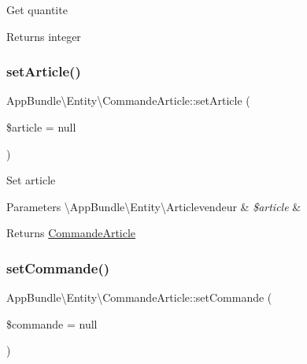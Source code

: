 Get quantite

\begin{DoxyReturn}{Returns}
integer 
\end{DoxyReturn}
\mbox{\label{class_app_bundle_1_1_entity_1_1_commande_article_a44944f056867cda01cbcfb7ca5b99f2a}} 
\subsubsection{\texorpdfstring{set\+Article()}{setArticle()}}
{\footnotesize\ttfamily App\+Bundle\textbackslash{}\+Entity\textbackslash{}\+Commande\+Article\+::set\+Article (\begin{DoxyParamCaption}\item[{\textbackslash{}\hyperlink{class_app_bundle_1_1_entity_1_1_articlevendeur}{App\+Bundle\textbackslash{}\+Entity\textbackslash{}\+Articlevendeur}}]{\$article = {\ttfamily null} }\end{DoxyParamCaption})}

Set article


\begin{DoxyParams}[1]{Parameters}
\textbackslash{}\+App\+Bundle\textbackslash{}\+Entity\textbackslash{}\+Articlevendeur & {\em \$article} & \\
\hline
\end{DoxyParams}
\begin{DoxyReturn}{Returns}
\hyperlink{class_app_bundle_1_1_entity_1_1_commande_article}{Commande\+Article} 
\end{DoxyReturn}
\mbox{\label{class_app_bundle_1_1_entity_1_1_commande_article_aa8272fdad840f61d6b473311b00502ef}} 
\subsubsection{\texorpdfstring{set\+Commande()}{setCommande()}}
{\footnotesize\ttfamily App\+Bundle\textbackslash{}\+Entity\textbackslash{}\+Commande\+Article\+::set\+Commande (\begin{DoxyParamCaption}\item[{\textbackslash{}\hyperlink{class_app_bundle_1_1_entity_1_1_commande}{App\+Bundle\textbackslash{}\+Entity\textbackslash{}\+Commande}}]{\$commande = {\ttfamily null} }\end{DoxyParamCaption})}


